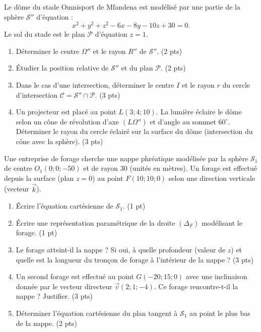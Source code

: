 \documentclass[11pt]{article}
\begin{document}
\begin{exercice}
Le dôme du stade Omnisport de Mfandena est modélisé par une partie de la sphère $\mathcal{S}''$ d'équation :
\[
x^2 + y^2 + z^2 - 6x - 8y - 10z + 30 = 0.
\]
Le sol du stade est le plan $\mathcal{P}$ d'équation $z = 1$.
\begin{enumerate}
    \item Déterminer le centre $\Omega''$ et le rayon $R''$ de $\mathcal{S}''$. \hfill (2 pts)
    \item Étudier la position relative de $\mathcal{S}''$ et du plan $\mathcal{P}$. \hfill (2 pts)
    \item Dans le cas d'une intersection, déterminer le centre $I$ et le rayon $r$ du cercle d'intersection $\mathcal{C} = \mathcal{S}'' \cap \mathcal{P}$. \hfill (3 pts)
    \item Un projecteur est placé au point $L(3; 4; 10)$. La lumière éclaire le dôme selon un cône de révolution d'axe $(L\Omega'')$ et d'angle au sommet $60^\circ$. Déterminer le rayon du cercle éclairé sur la surface du dôme (intersection du cône avec la sphère). \hfill (3 pts)
\end{enumerate}
\end{exercice}

\begin{exercice}
Une entreprise de forage cherche une nappe phréatique modélisée par la sphère $\mathcal{S}_1$ de centre $O_1(0; 0; -50)$ et de rayon $30$ (unités en mètres). Un forage est effectué depuis la surface (plan $z=0$) au point $F(10; 10; 0)$ selon une direction verticale (vecteur $\vec{k}$).
\begin{enumerate}
    \item Écrire l'équation cartésienne de $\mathcal{S}_1$. \hfill (1 pt)
    \item Écrire une représentation paramétrique de la droite $(\Delta_F)$ modélisant le forage. \hfill (1 pt)
    \item Le forage atteint-il la nappe ? Si oui, à quelle profondeur (valeur de $z$) et quelle est la longueur du tronçon de forage à l'intérieur de la nappe ? \hfill (3 pts)
    \item Un second forage est effectué au point $G(-20; 15; 0)$ avec une inclinaison donnée par le vecteur directeur $\vec{v}(2; 1; -4)$. Ce forage rencontre-t-il la nappe ? Justifier. \hfill (3 pts)
    \item Déterminer l'équation cartésienne du plan tangent à $\mathcal{S}_1$ au point le plus bas de la nappe. \hfill (2 pts)
\end{enumerate}
\end{exercice}
\end{document}
